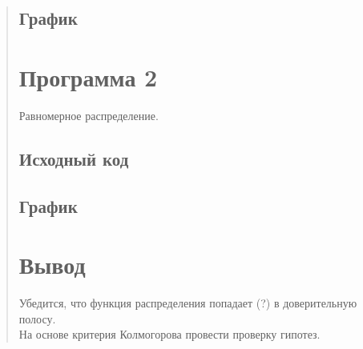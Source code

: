 \documentclass{article}
\begin{document}
\begin{quote}
\subsection{График}

\section{Программа 2}
	Равномерное распределение.
\subsection{Исходный код}
        \begin{minipage}{\linewidth}
	    
        \end{minipage}
\subsection{График}

\section{Вывод}
	Убедится, что функция распределения попадает (?) в доверительную полосу.\\
	На основе критерия Колмогорова провести проверку гипотез.
\end{quote}
\end{document}
